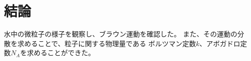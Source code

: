 \documentclass[../../../main]{subfiles}
\begin{document}
\section{結論}\label{sec:conclusion}
水中の微粒子の様子を観察し、ブラウン運動を確認した。
また、その運動の分散を求めることで、粒子に関する物理量である
ボルツマン定数$k$、アボガドロ定数$N_A$を求めることができた。
\end{document}
